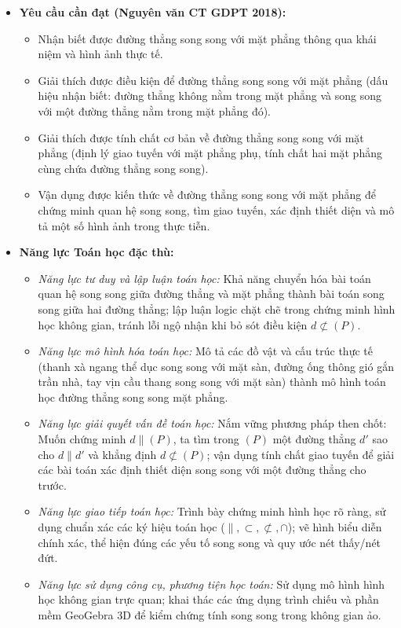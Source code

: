 \documentclass[12pt, a4paper]{article}
\begin{document}
\begin{itemize}[leftmargin=1.2cm]
    \item \textbf{Yêu cầu cần đạt (Nguyên văn CT GDPT 2018):}
    \begin{itemize}[leftmargin=0.6cm]
        \item Nhận biết được đường thẳng song song với mặt phẳng thông qua khái niệm và hình ảnh thực tế.
        \item Giải thích được điều kiện để đường thẳng song song với mặt phẳng (dấu hiệu nhận biết: đường thẳng không nằm trong mặt phẳng và song song với một đường thẳng nằm trong mặt phẳng đó).
        \item Giải thích được tính chất cơ bản về đường thẳng song song với mặt phẳng (định lý giao tuyến với mặt phẳng phụ, tính chất hai mặt phẳng cùng chứa đường thẳng song song).
        \item Vận dụng được kiến thức về đường thẳng song song với mặt phẳng để chứng minh quan hệ song song, tìm giao tuyến, xác định thiết diện và mô tả một số hình ảnh trong thực tiễn.
    \end{itemize}

    \item \textbf{Năng lực Toán học đặc thù:}
    \begin{itemize}[leftmargin=0.6cm]
        \item \textit{Năng lực tư duy và lập luận toán học:} Khả năng chuyển hóa bài toán quan hệ song song giữa đường thẳng và mặt phẳng thành bài toán song song giữa hai đường thẳng; lập luận logic chặt chẽ trong chứng minh hình học không gian, tránh lỗi ngộ nhận khi bỏ sót điều kiện $d \not\subset (P)$.
        \item \textit{Năng lực mô hình hóa toán học:} Mô tả các đồ vật và cấu trúc thực tế (thanh xà ngang thể dục song song với mặt sàn, đường ống thông gió gắn trần nhà, tay vịn cầu thang song song với mặt sàn) thành mô hình toán học đường thẳng song song mặt phẳng.
        \item \textit{Năng lực giải quyết vấn đề toán học:} Nắm vững phương pháp then chốt: Muốn chứng minh $d \parallel (P)$, ta tìm trong $(P)$ một đường thẳng $d'$ sao cho $d \parallel d'$ và khẳng định $d \not\subset (P)$; vận dụng tính chất giao tuyến để giải các bài toán xác định thiết diện song song với một đường thẳng cho trước.
        \item \textit{Năng lực giao tiếp toán học:} Trình bày chứng minh hình học rõ ràng, sử dụng chuẩn xác các ký hiệu toán học ($\parallel, \subset, \not\subset, \cap$); vẽ hình biểu diễn chính xác, thể hiện đúng các yếu tố song song và quy ước nét thấy/nét đứt.
        \item \textit{Năng lực sử dụng công cụ, phương tiện học toán:} Sử dụng mô hình hình học không gian trực quan; khai thác các ứng dụng trình chiếu và phần mềm GeoGebra 3D để kiểm chứng tính song song trong không gian ảo.
    \end{itemize}


\end{itemize}
\end{document}
